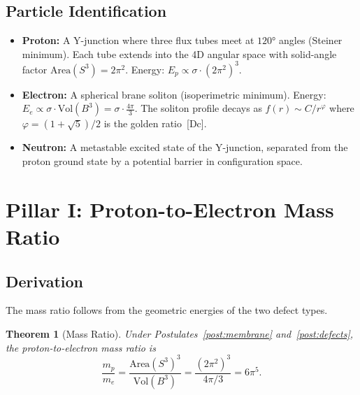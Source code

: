 \documentclass[12pt,a4paper]{article}
\newtheorem{theorem}{Theorem}
\theoremstyle{definition}
\theoremstyle{remark}
\newcommand{\tagDc}{\textsf{[Dc]}}
\begin{document}
\subsection{Particle Identification}

\begin{itemize}[nosep]
\item \textbf{Proton:} A Y-junction where three flux tubes meet at
  $120°$ angles (Steiner minimum).  Each tube extends into the 4D
  angular space with solid-angle factor $\mathrm{Area}(S^3) = 2\pi^2$.
  Energy: $E_p \propto \sigma \cdot (2\pi^2)^3$.

\item \textbf{Electron:} A spherical brane soliton (isoperimetric
  minimum).  Energy: $E_e \propto \sigma \cdot \mathrm{Vol}(B^3)
  = \sigma \cdot \tfrac{4\pi}{3}$.  The soliton profile decays as
  $f(r) \sim C/r^\varphi$ where $\varphi = (1+\sqrt{5})/2$ is the
  golden ratio~\tagDc.

\item \textbf{Neutron:} A metastable excited state of the Y-junction,
  separated from the proton ground state by a potential barrier in
  configuration space.
\end{itemize}

\section{Pillar I: Proton-to-Electron Mass Ratio}
\label{sec:mass-ratio}

\subsection{Derivation}

The mass ratio follows from the geometric energies of the two
defect types.

\begin{theorem}[Mass Ratio]
\label{thm:mass-ratio}
Under Postulates~\ref{post:membrane} and~\ref{post:defects}, the
proton-to-electron mass ratio is
\begin{equation}
  \frac{m_p}{m_e}
    = \frac{\mathrm{Area}(S^3)^3}{\mathrm{Vol}(B^3)}
    = \frac{(2\pi^2)^3}{4\pi/3}
    = 6\pi^5.
  \label{eq:mass-ratio}
\end{equation}
\end{theorem}
\end{document}
